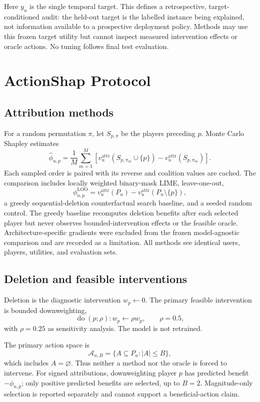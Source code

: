 \documentclass[pdflatex,sn-basic]{sn-jnl}
\begin{document}
Here $y_u$ is the single temporal target. This defines a retrospective, target-conditioned audit: the held-out target is the labelled instance being explained, not information available to a prospective deployment policy. Methods may use this frozen target utility but cannot inspect measured intervention effects or oracle actions. No tuning follows final test evaluation.

\section{ActionShap Protocol}
\subsection{Attribution methods}
For a random permutation $\pi$, let $S_{p,\pi}$ be the players preceding $p$. Monte Carlo Shapley estimates
\begin{equation}
\widehat\phi_{u,p}=\frac{1}{M}\sum_{m=1}^{M}
\left[v_u^{\mathrm{attr}}(S_{p,\pi_m}\cup\{p\})-v_u^{\mathrm{attr}}(S_{p,\pi_m})\right].
\end{equation}
Each sampled order is paired with its reverse and coalition values are cached. The comparison includes locally weighted binary-mask LIME, leave-one-out,
\begin{equation}
\phi^{\mathrm{LOO}}_{u,p}=v_u^{\mathrm{attr}}(P_u)-v_u^{\mathrm{attr}}(P_u\setminus\{p\}),
\end{equation}
a greedy sequential-deletion counterfactual search baseline, and a seeded random control. The greedy baseline recomputes deletion benefits after each selected player but never observes bounded-intervention effects or the feasible oracle. Architecture-specific gradients were excluded from the frozen model-agnostic comparison and are recorded as a limitation. All methods see identical users, players, utilities, and evaluation sets.

\subsection{Deletion and feasible interventions}
Deletion is the diagnostic intervention $w_p\leftarrow0$. The primary feasible intervention is bounded downweighting,
\begin{equation}
\operatorname{do}(p;\rho): w_p\leftarrow\rho w_p,\qquad \rho=0.5,
\end{equation}
with $\rho=0.25$ as sensitivity analysis. The model is not retrained.

The primary action space is
\begin{equation}
\mathcal A_{u,B}=\{A\subseteq P_u:|A|\le B\},
\end{equation}
which includes $A=\varnothing$. Thus neither a method nor the oracle is forced to intervene. For signed attributions, downweighting player $p$ has predicted benefit $-\phi_{u,p}$; only positive predicted benefits are selected, up to $B=2$. Magnitude-only selection is reported separately and cannot support a beneficial-action claim.
\end{document}
